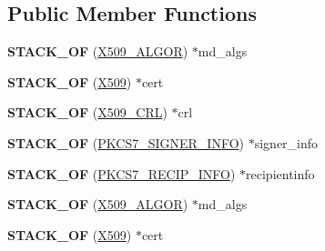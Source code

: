 \subsection*{Public Member Functions}
\begin{DoxyCompactItemize}
\item 
\mbox{\label{structpkcs7__signedandenveloped__st_a371965c92590d7c7d5e131a65ef0ea4c}} 
{\bfseries S\+T\+A\+C\+K\+\_\+\+OF} (\hyperlink{structX509__algor__st}{X509\+\_\+\+A\+L\+G\+OR}) $\ast$md\+\_\+algs
\item 
\mbox{\label{structpkcs7__signedandenveloped__st_af51fdd4b6d747aa931e5b2c1e7a64750}} 
{\bfseries S\+T\+A\+C\+K\+\_\+\+OF} (\hyperlink{structx509__st}{X509}) $\ast$cert
\item 
\mbox{\label{structpkcs7__signedandenveloped__st_aa349f9695dc03a7db43d8ebdd765120e}} 
{\bfseries S\+T\+A\+C\+K\+\_\+\+OF} (\hyperlink{structX509__crl__st}{X509\+\_\+\+C\+RL}) $\ast$crl
\item 
\mbox{\label{structpkcs7__signedandenveloped__st_a00fa5f536ef6fa7dea07597173710ea3}} 
{\bfseries S\+T\+A\+C\+K\+\_\+\+OF} (\hyperlink{structpkcs7__signer__info__st}{P\+K\+C\+S7\+\_\+\+S\+I\+G\+N\+E\+R\+\_\+\+I\+N\+FO}) $\ast$signer\+\_\+info
\item 
\mbox{\label{structpkcs7__signedandenveloped__st_a85b554ac212a0a85f8a13b489cb6e546}} 
{\bfseries S\+T\+A\+C\+K\+\_\+\+OF} (\hyperlink{structpkcs7__recip__info__st}{P\+K\+C\+S7\+\_\+\+R\+E\+C\+I\+P\+\_\+\+I\+N\+FO}) $\ast$recipientinfo
\item 
\mbox{\label{structpkcs7__signedandenveloped__st_a371965c92590d7c7d5e131a65ef0ea4c}} 
{\bfseries S\+T\+A\+C\+K\+\_\+\+OF} (\hyperlink{structX509__algor__st}{X509\+\_\+\+A\+L\+G\+OR}) $\ast$md\+\_\+algs
\item 
\mbox{\label{structpkcs7__signedandenveloped__st_af51fdd4b6d747aa931e5b2c1e7a64750}} 
{\bfseries S\+T\+A\+C\+K\+\_\+\+OF} (\hyperlink{structx509__st}{X509}) $\ast$cert
\item 

\end{DoxyCompactItemize}

